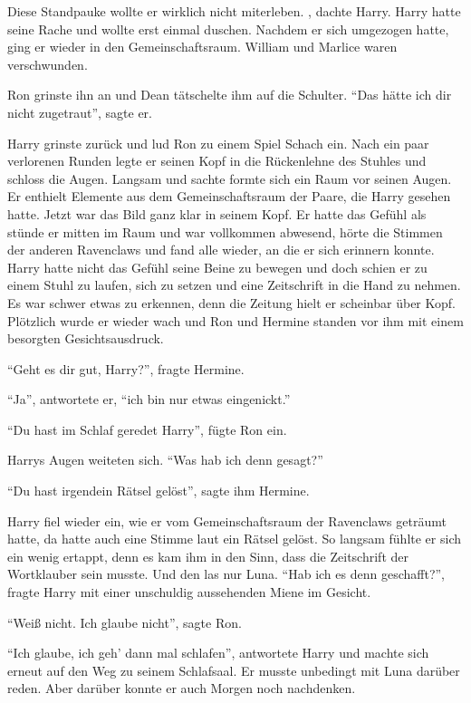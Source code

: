 Diese Standpauke wollte er wirklich nicht miterleben. , dachte Harry.  Harry hatte seine Rache und wollte erst einmal duschen. Nachdem er sich umgezogen hatte, ging er wieder in den Gemeinschaftsraum. William und Marlice waren verschwunden.

Ron grinste ihn an und Dean tätschelte ihm auf die Schulter. \enquote{Das hätte ich dir nicht zugetraut}, sagte er.

Harry grinste zurück und lud Ron zu einem Spiel Schach ein. Nach ein paar verlorenen Runden legte er seinen Kopf in die Rückenlehne des Stuhles und schloss die Augen. Langsam und sachte formte sich ein Raum vor seinen Augen. Er enthielt Elemente aus dem Gemeinschaftsraum der Paare, die Harry gesehen hatte. Jetzt war das Bild ganz klar in seinem Kopf. Er hatte das Gefühl als stünde er mitten im Raum und war vollkommen abwesend, hörte die Stimmen der anderen Ravenclaws und fand alle wieder, an die er sich erinnern konnte. Harry hatte nicht das Gefühl seine Beine zu bewegen und doch schien er zu einem Stuhl zu laufen, sich zu setzen und eine Zeitschrift in die Hand zu nehmen. Es war schwer etwas zu erkennen, denn die Zeitung hielt er scheinbar über Kopf. Plötzlich wurde er wieder wach und Ron und Hermine standen vor ihm mit einem besorgten Gesichtsausdruck.

\enquote{Geht es dir gut, Harry?}, fragte Hermine.

\enquote{Ja}, antwortete er, \enquote{ich bin nur etwas eingenickt.}

\enquote{Du hast im Schlaf geredet Harry}, fügte Ron ein.

Harrys Augen weiteten sich. \enquote{Was hab ich denn gesagt?}

\enquote{Du hast irgendein Rätsel gelöst}, sagte ihm Hermine.

Harry fiel wieder ein, wie er vom Gemeinschaftsraum der Ravenclaws geträumt hatte, da hatte auch eine Stimme laut ein Rätsel gelöst. So langsam fühlte er sich ein wenig ertappt, denn es kam ihm in den Sinn, dass die Zeitschrift der Wortklauber sein musste. Und den las nur Luna. \enquote{Hab ich es denn geschafft?}, fragte Harry mit einer unschuldig aussehenden Miene im Gesicht.

\enquote{Weiß nicht. Ich glaube nicht}, sagte Ron.

\enquote{Ich glaube, ich geh' dann mal schlafen}, antwortete Harry und machte sich erneut auf den Weg zu seinem Schlafsaal. Er musste unbedingt mit Luna darüber reden. Aber darüber konnte er auch Morgen noch nachdenken.

